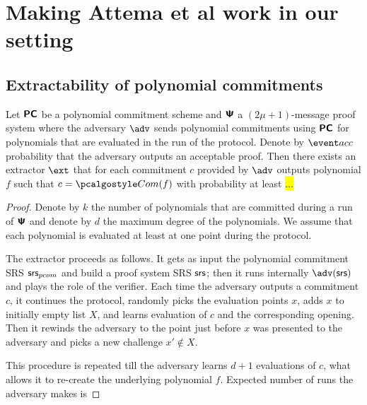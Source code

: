 
\section{Making Attema et al work in our setting}
\newcommand{\epsa}{\eps_{\mathsf{attema}}}

\subsection{Extractability of polynomial commitments}

\begin{lemma}
  Let $\bm{\mathsf{PC}}$ be a polynomial commitment scheme and $\bm{\mathsf{\Psi}}$ a $(2 \mu + 1)$-message
  proof system where the adversary $\adv$ sends polynomial commitments using $\bm{\mathsf{PC}}$ for
  polynomials that are evaluated in the run of the protocol. Denote by $\accProb$
  probability that the adversary outputs an acceptable proof. Then there exists an
  extractor $\ext$ that for each commitment $c$ provided by $\adv$ outputs polynomial $f$
  such that $c = \com (f)$ with probability at least \hl{...}
\end{lemma}

\begin{proof}
  Denote by $k$ the number of polynomials that are committed during a run of
  $\bm{\mathsf{\Psi}}$ and denote by $d$ the maximum degree of the polynomials. We assume that
  each polynomial is evaluated at least at one point during the protocol.

  The extractor proceeds as follows. It gets as input the polynomial commitment SRS
  $\mathsf{srs}_{pcom}$ and build a proof system SRS $\mathsf{srs}$; then it runs internally $\adv (\srs)$
  and plays the role of the verifier. Each time the adversary outputs a commitment $c$, it
  continues the protocol, randomly picks the evaluation points $x$, adds $x$ to initially
  empty list $X$, and learns evaluation of $c$ and the corresponding opening. Then it
  rewinds the adversary to the point just before $x$ was presented to the adversary and
  picks a new challenge $x' \not \in X$.

  This procedure is repeated till the adversary learns $d + 1$ evaluations of $c$, what
  allows it to re-create the underlying polynomial $f$. Expected number of runs the
  adversary makes is 
\end{proof}

